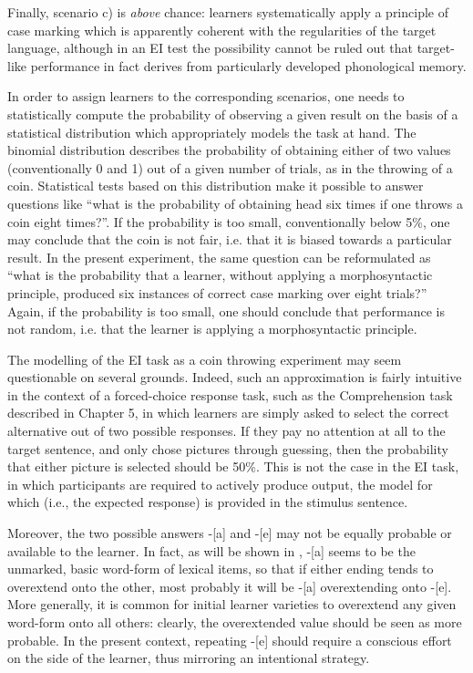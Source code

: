 Finally, scenario c) is \textit{above} chance: learners systematically apply a principle of case marking which is apparently coherent with the regularities of the target language, although in an EI test the possibility cannot be ruled out that target-like performance in fact derives from particularly developed phonological memory.

In order to assign learners to the corresponding scenarios, one needs to statistically compute the probability of observing a given result on the basis of a statistical distribution which appropriately models the task at hand. The binomial distribution describes the probability of obtaining either of two values (conventionally 0 and 1) out of a given number of trials, as in the throwing of a coin. Statistical tests based on this distribution make it possible to answer  questions like ``what is the probability of obtaining head six times if one throws a coin eight times?''. If the probability is too small, conventionally below 5\%, one may conclude that the coin is not fair, i.e. that it is biased towards a particular result. In the present experiment, the same question can be reformulated as ``what is the probability that a learner, without applying a morphosyntactic principle, produced six instances of correct case marking over eight trials?'' Again, if the probability is too small, one should conclude that performance is not random, i.e. that the learner is applying a morphosyntactic principle.

The modelling of the EI task as a coin throwing experiment may seem questionable on several grounds. Indeed, such an approximation is fairly intuitive in the context of a forced-choice response task, such as the Comprehension task described in Chapter 5, in which learners are simply asked to select the correct alternative out of two possible responses. If they pay no attention at all to the target sentence, and only chose pictures through guessing, then the probability that either picture is selected should be 50\%. This is not the case in the EI task, in which participants are required to actively produce output, the model for which (i.e., the expected response) is provided in the stimulus sentence. 

Moreover, the two possible answers -[a] and -[e] may not be equally probable or available to the learner. In fact, as will be shown in , -[a] seems to be the unmarked, basic word-form of lexical items, so that if either ending tends to overextend onto the other, most probably it will be -[a] overextending onto -[e]. More generally, it is common for initial learner varieties to overextend any given word-form onto all others: clearly, the overextended value should be seen as more probable. In the present context, repeating -[e] should require a conscious effort on the side of the learner, thus mirroring an intentional strategy.

